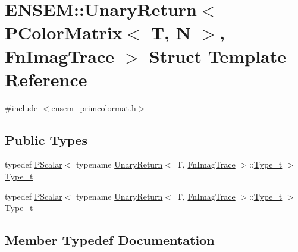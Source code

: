 \hypertarget{structENSEM_1_1UnaryReturn_3_01PColorMatrix_3_01T_00_01N_01_4_00_01FnImagTrace_01_4}{}\section{E\+N\+S\+EM\+:\+:Unary\+Return$<$ P\+Color\+Matrix$<$ T, N $>$, Fn\+Imag\+Trace $>$ Struct Template Reference}
\label{structENSEM_1_1UnaryReturn_3_01PColorMatrix_3_01T_00_01N_01_4_00_01FnImagTrace_01_4}


{\ttfamily \#include $<$ensem\+\_\+primcolormat.\+h$>$}

\subsection*{Public Types}
\begin{DoxyCompactItemize}
\item 
typedef \mbox{\hyperlink{classENSEM_1_1PScalar}{P\+Scalar}}$<$ typename \mbox{\hyperlink{structENSEM_1_1UnaryReturn}{Unary\+Return}}$<$ T, \mbox{\hyperlink{structENSEM_1_1FnImagTrace}{Fn\+Imag\+Trace}} $>$\+::\mbox{\hyperlink{structENSEM_1_1UnaryReturn_3_01PColorMatrix_3_01T_00_01N_01_4_00_01FnImagTrace_01_4_a8af03bca3da42c1840803fcbcdf3ad74}{Type\+\_\+t}} $>$ \mbox{\hyperlink{structENSEM_1_1UnaryReturn_3_01PColorMatrix_3_01T_00_01N_01_4_00_01FnImagTrace_01_4_a8af03bca3da42c1840803fcbcdf3ad74}{Type\+\_\+t}}
\item 
typedef \mbox{\hyperlink{classENSEM_1_1PScalar}{P\+Scalar}}$<$ typename \mbox{\hyperlink{structENSEM_1_1UnaryReturn}{Unary\+Return}}$<$ T, \mbox{\hyperlink{structENSEM_1_1FnImagTrace}{Fn\+Imag\+Trace}} $>$\+::\mbox{\hyperlink{structENSEM_1_1UnaryReturn_3_01PColorMatrix_3_01T_00_01N_01_4_00_01FnImagTrace_01_4_a8af03bca3da42c1840803fcbcdf3ad74}{Type\+\_\+t}} $>$ \mbox{\hyperlink{structENSEM_1_1UnaryReturn_3_01PColorMatrix_3_01T_00_01N_01_4_00_01FnImagTrace_01_4_a8af03bca3da42c1840803fcbcdf3ad74}{Type\+\_\+t}}
\end{DoxyCompactItemize}


\subsection{Member Typedef Documentation}
\mbox{\label{structENSEM_1_1UnaryReturn_3_01PColorMatrix_3_01T_00_01N_01_4_00_01FnImagTrace_01_4_a8af03bca3da42c1840803fcbcdf3ad74}} 
